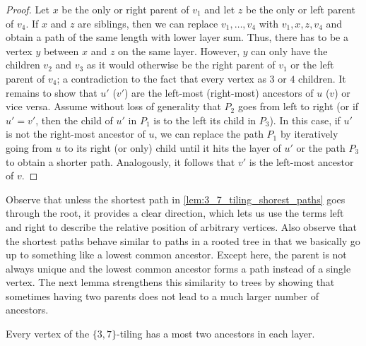 \begin{proof}
    Let $x$ be the only or right parent of $v_1$ and let $z$ be the only or left parent of $v_4$.
    If $x$ and $z$ are siblings, then we can replace $v_1, \dots, v_4$ with $v_1, x, z, v_4$ and obtain a path of the same length with lower layer sum.
    Thus, there has to be a vertex $y$ between $x$ and $z$ on the same layer.
    However, $y$ can only have the children $v_2$ and $v_3$ as it would otherwise be the right parent of $v_1$ or the left parent of $v_4$; a contradiction to the fact that every vertex as $3$ or $4$ children.
%
    It remains to show that $u'$ ($v'$) are the left-most (right-most) ancestors of $u$ ($v$) or vice versa.
    Assume without loss of generality that $P_2$ goes from left to right (or if $u' = v'$, then the child of $u'$ in $P_1$ is to the left its child in $P_3$).
    In this case, if $u'$ is not the right-most ancestor of $u$, we can replace the path $P_1$ by iteratively going from $u$ to its right (or only) child until it hits the layer of $u'$ or the path $P_3$ to obtain a shorter path.
    Analogously, it follows that $v'$ is the left-most ancestor of $v$.
\end{proof}
%
Observe that unless the shortest path in \cref{lem:3_7_tiling_shorest_paths} goes through the root, it provides a clear direction, which lets us use the terms left and right to describe the relative position of arbitrary vertices.
%
Also observe that the shortest paths behave similar to paths in a rooted tree in that we basically go up to something like a lowest common ancestor.
Except here, the parent is not always unique and the lowest common ancestor forms a path instead of a single vertex.
The next lemma strengthens this similarity to trees by showing that sometimes having two parents does not lead to a much larger number of ancestors.
%
\begin{lemma}
    \label{lem:3_7_tiling_at_most_two_ancestors}
    Every vertex of the $\{3, 7\}$-tiling has a most two ancestors in each layer.
\end{lemma}
